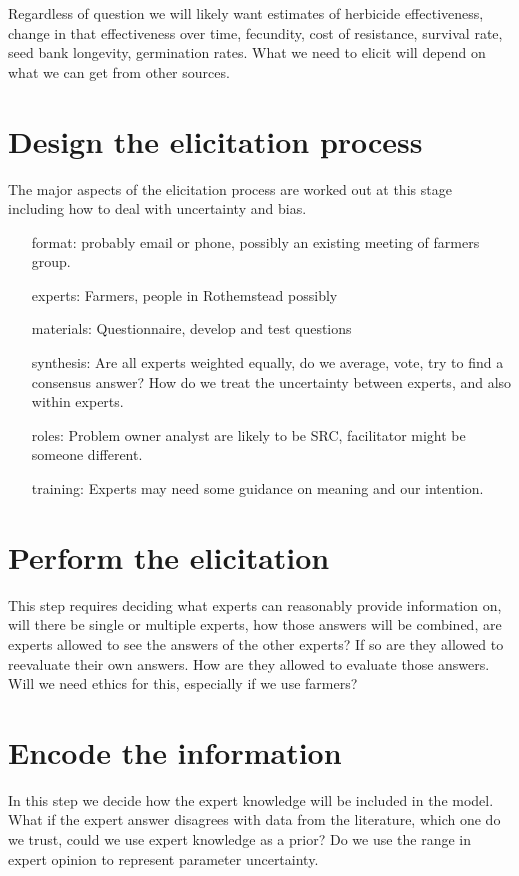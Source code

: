 \documentclass[12pt, a4paper]{article}
\begin{document}
Regardless of question we will likely want estimates of herbicide effectiveness, change in that effectiveness over time, fecundity, cost of resistance, survival rate, seed bank longevity, germination rates. What we need to elicit will depend on what we can get from other sources. 
	

\section{Design the elicitation process}
The major aspects of the elicitation process are worked out at this stage including how to deal with uncertainty and bias. 
\begin{enumerate}
	\item[format:] probably email or phone, possibly an existing meeting of farmers group.
	\item[experts:] Farmers, people in Rothemstead possibly
	\item[materials:] Questionnaire, develop and test questions
	\item[synthesis:] Are all experts weighted equally, do we average, vote, try to find a consensus answer? How do we treat the uncertainty between experts, and also within experts.
	\item[roles:] Problem owner analyst are likely to be SRC, facilitator might be someone different.
	\item[training:] Experts may need some guidance on meaning and our intention.    
\end{enumerate}

\section{Perform the elicitation}
This step requires deciding what experts can reasonably provide information on, will there be single or multiple experts, how those answers will be combined, are experts allowed to see the answers of the other experts? If so are they allowed to reevaluate their own answers. How are they allowed to evaluate those answers. Will we need ethics for this, especially if we use farmers?

\section{Encode the information}
In this step we decide how the expert knowledge will be included in the model. What if the expert answer disagrees with data from the literature, which one do we trust, could we use expert knowledge as a prior? Do we use the range in expert opinion to represent parameter uncertainty. 


 

\end{document}

